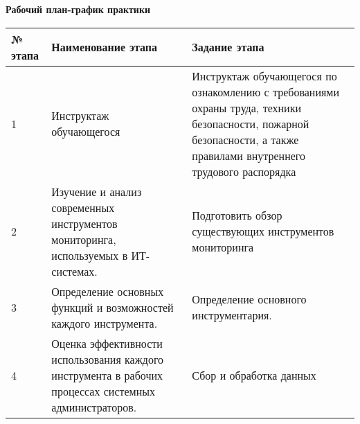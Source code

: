  \hypertarget{app-a}{\label{app-a}}

\begin{center}
    \textbf{Рабочий план-график практики}
\end{center}

\vspace{\baselineskip}

\small\begin{longtable}{|l|p{6cm}|p{6cm}|}
    \hline
    № этапа & Наименование этапа                                                                                                                                      & Задание этапа                                                                                                                                                        \\ \hline
    1       & Инструктаж обучающегося                                                                                                                                 & Инструктаж обучающегося по ознакомлению с требованиями охраны труда, техники безопасности, пожарной безопасности, а также правилами внутреннего трудового распорядка \\ \hline
    2       & Изучение и анализ современных инструментов мониторинга, используемых в ИТ-системах.                                                                     & Подготовить обзор существующих инструментов мониторинга                                                                                                              \\ \hline
    3       & Определение основных функций и возможностей каждого инструмента.                                                                                        & Определение основного инструментария.                                                                                                                                \\ \hline
    4       & Оценка эффективности использования каждого инструмента в рабочих процессах системных администраторов.                                                   & Сбор и обработка данных                                                                                                                                              \\ \hline

\end{longtable}
